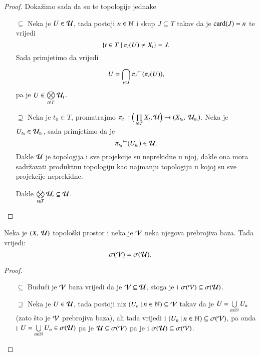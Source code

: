 \begin{proof}
    Doka\v zimo sada da su te topologije jednake
    \begin{enumerate}
        \item[$\subseteq$] Neka je $U \in \mathcal{U}$, tada postoji $n \in \mathbb{N}$ i skup $J \subseteq T$ takav da je $\mathrm{card}({J}) = n$ te vrijedi
        \begin{equation*}
            \{{t \in T} \: | \: {\pi_t(U) \neq X_t}\} = J.
        \end{equation*}
        Sada primjetimo da vrijedi
        \begin{equation*}
            U = \bigcap\limits_{t \in J}^{} {\pi_t}^{\leftarrow} (\pi_t (U)),
        \end{equation*}
        pa je $U \in \bigotimes\limits_{t \in T}^{} \mathcal{U}_t$.
        \item[$\supseteq$]
        Neka je $t_0 \in T$, promatrajmo $\pi_{t_0} : \Big( \prod\limits_{t \in T}^{} X_t, \mathcal{U} \Big) \to ({X_{t_0}}, \: {\mathcal{U}_{t_0}})$.
        Neka je $U_{t_0} \in \mathcal{U}_{t_0}$, sada primjetimo da je
        \begin{equation*}
            {\pi_{t_0}}^{\leftarrow} (U_{t_0}) \in \mathcal{U}.
        \end{equation*}
        Dakle $\mathcal{U}$ je topologija i sve projekcije su neprekidne u njoj, dakle ona mora sadr\v zavati produktnu topologiju kao najmanju topologiju u kojoj su sve projekcije neprekidne.

        Dakle $\bigotimes\limits_{t \in T}^{} \mathcal{U}_t \subseteq \mathcal{U}$.
    \end{enumerate}
\end{proof}

\begin{tm}  \label{tm:4.0-3}
    Neka je $({X}, \: {\mathcal{U}})$ topolo\v ski prostor i neka je $\mathcal{V}$ neka njegova prebrojiva baza.
    Tada vrijedi:
    \begin{equation*}
        \sigma({\mathcal{V}}) = \sigma({\mathcal{U}}).
    \end{equation*}
\end{tm}

\begin{proof}
    \quad
    \begin{enumerate}
        \item[$\subseteq$] Budu\' ci je $\mathcal{V}$ baza vrijedi da je $\mathcal{V} \subseteq \mathcal{U}$, stoga je i $\sigma({\mathcal{V}}) \subseteq \sigma({\mathcal{U}})$.
        \item[$\supseteq$] Neka je $U \in \mathcal{U}$, tada postoji niz $({U_n} \: | \: {n \in \mathbb{N}}) \subseteq \mathcal{V}$ takav da je $U = \bigcup\limits_{n \in \mathbb{N}}^{} U_n$ (zato \v sto je $\mathcal{V}$ prebrojiva baza), ali tada vrijedi i $({U_n} \: | \: {n \in \mathbb{N}}) \subseteq \sigma({\mathcal{V}})$, pa onda i $U = \bigcup\limits_{n \in \mathbb{N}}^{} U_n \in \sigma({\mathcal{U}})$ pa je $\mathcal{U} \subseteq \sigma({\mathcal{V}})$ pa je i $\sigma({\mathcal{U}}) \subseteq \sigma({\mathcal{V}})$.  
    \end{enumerate}
\end{proof}

